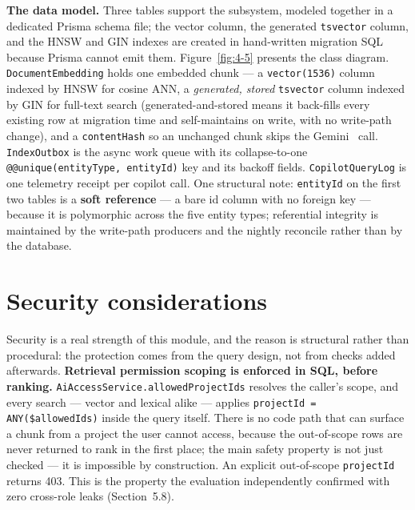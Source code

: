 \textbf{The data model.} Three tables support the subsystem, modeled together in a dedicated Prisma schema file; the
vector column, the generated \texttt{tsvector} column, and the HNSW and GIN indexes are created in hand-written
migration SQL because Prisma cannot emit them. Figure~\ref{fig:4-5} presents the class diagram.
\texttt{DocumentEmbedding} holds one embedded chunk --- a \texttt{vector(1536)} column indexed by HNSW for cosine ANN, a
\emph{generated, stored} \texttt{tsvector} column indexed by GIN for full-text search (generated-and-stored means it
back-fills every existing row at migration time and self-maintains on write, with no write-path change), and a
\texttt{contentHash} so an unchanged chunk skips the Gemini~\cite{gemini} call. \texttt{IndexOutbox} is the async work queue with its
collapse-to-one \texttt{@@unique(entityType, entityId)} key and its backoff fields. \texttt{CopilotQueryLog} is one
telemetry receipt per copilot call. One structural note: \texttt{entityId} on the first two tables is a \textbf{soft
reference} --- a bare id column with no foreign key --- because it is polymorphic across the five entity types;
referential integrity is maintained by the write-path producers and the nightly reconcile rather than by the
database.


\section{Security considerations}

Security is a real strength of this module, and the reason is structural rather than procedural: the
protection comes from the query design, not from checks added afterwards.
\textbf{Retrieval permission scoping is enforced in SQL, before ranking.} \texttt{AiAccessService.allowedProjectIds}
resolves the caller's scope, and every search --- vector and lexical alike --- applies \texttt{projectId = ANY(\$allowedIds)} inside the query itself. There is no code path that can surface a chunk from a project the
user cannot access, because the out-of-scope rows are never returned to rank in the first place; the main
safety property is not just checked --- it is impossible by construction. An explicit out-of-scope
\texttt{projectId} returns 403. This is the property the evaluation independently confirmed with zero
cross-role leaks (Section~5.8).

